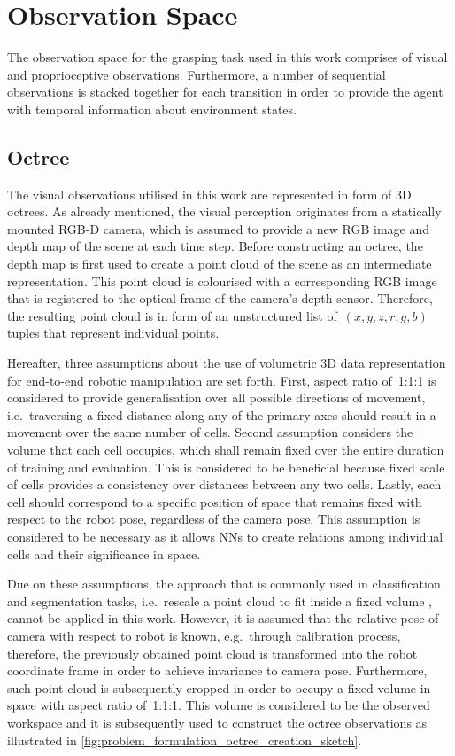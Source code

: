 \section{Observation Space}

The observation space for the grasping task used in this work comprises of visual and proprioceptive observations. Furthermore, a number of sequential observations is stacked together for each transition in order to provide the agent with temporal information about environment states.


\subsection{Octree}\label{subsec:problem_formulation_octree}

The visual observations utilised in this work are represented in form of 3D octrees. As already mentioned, the visual perception originates from a statically mounted RGB-D camera, which is assumed to provide a new RGB image and depth map of the scene at each time step. Before constructing an octree, the depth map is first used to create a point cloud of the scene as an intermediate representation. This point cloud is colourised with a corresponding RGB image that is registered to the optical frame of the camera's depth sensor. Therefore, the resulting point cloud is in form of an unstructured list of~\((x,y,z,r,g,b)\) tuples that represent individual points.

Hereafter, three assumptions about the use of volumetric 3D data representation for end-to-end robotic manipulation are set forth. First, aspect ratio of~1:1:1 is considered to provide generalisation over all possible directions of movement, i.e.~traversing a fixed distance along any of the primary axes should result in a movement over the same number of cells. Second assumption considers the volume that each cell occupies, which shall remain fixed over the entire duration of training and evaluation. This is considered to be beneficial because fixed scale of cells provides a consistency over distances between any two cells. Lastly, each cell should correspond to a specific position of space that remains fixed with respect to the robot pose, regardless of the camera pose. This assumption is considered to be necessary as it allows NNs to create relations among individual cells and their significance in space.

Due on these assumptions, the approach that is commonly used in classification and segmentation tasks, i.e.~rescale a point cloud to fit inside a fixed volume \cite{wang_o-cnn_2017}, cannot be applied in this work. However, it is assumed that the relative pose of camera with respect to robot is known, e.g.~through calibration process, therefore, the previously obtained point cloud is transformed into the robot coordinate frame in order to achieve invariance to camera pose. Furthermore, such point cloud is subsequently cropped in order to occupy a fixed volume in space with aspect ratio of~1:1:1. This volume is considered to be the observed workspace and it is subsequently used to construct the octree observations as illustrated in \autoref{fig:problem_formulation_octree_creation_sketch}.

